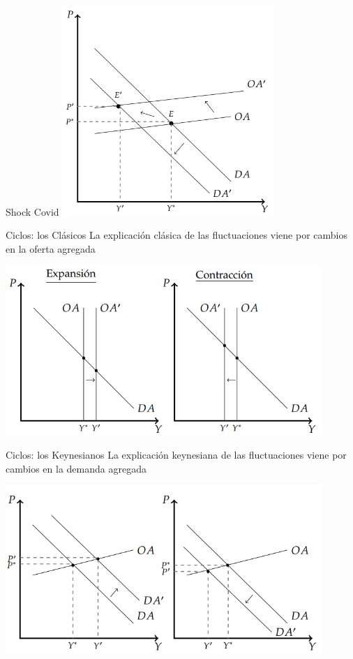 \documentclass{beamer}
\begin{document}
\begin{frame}{Shock Covid}
    \centering
    \includegraphics[width=0.6\textwidth]{../Figures/C33.10.png}
\end{frame}

\begin{frame}{Ciclos: los Clásicos}
    La explicación clásica de las fluctuaciones viene por cambios en la oferta agregada
    
    \centering
    \includegraphics[width=0.9\textwidth]{../Figures/C33.11.png}
\end{frame}
    
\begin{frame}{Ciclos: los Keynesianos}
    La explicación keynesiana de las fluctuaciones viene por cambios en la demanda agregada
    
    \centering
    \includegraphics[width=0.9\textwidth]{../Figures/C33.12.png}
\end{frame}
\end{document}
